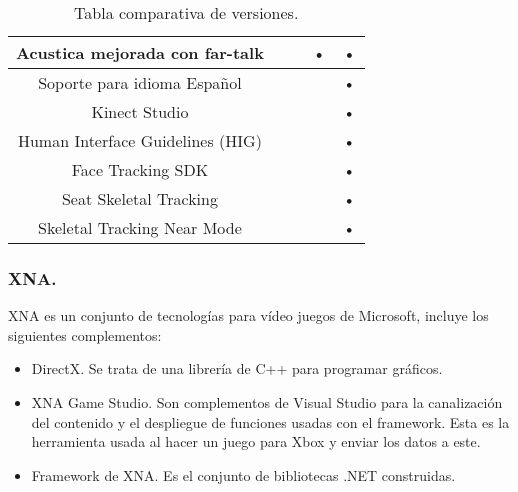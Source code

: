 \documentclass[11pt,a4paper]{article}
\begin{document}
\begin{table}
\begin{tabular}{||c||c||c||c||c||}
\hline Acustica mejorada con far-talk           &        &        & •         & •           \\  
\hline Soporte para idioma Español              &        &        &           & •           \\ 
\hline Kinect Studio                            &        &        &           & •           \\ 
\hline Human Interface Guidelines (HIG)         &        &        &           & •           \\ 
\hline Face Tracking SDK                        &        &        &           & •           \\ 
\hline Seat Skeletal Tracking                   &        &        &           & •           \\ 
\hline Skeletal Tracking Near Mode              &        &        &           & •           \\ 
\hline 
\end{tabular} 
\caption{Tabla comparativa de versiones.}
\end{table}

\subsubsection{XNA.}
XNA es un conjunto de tecnologías para vídeo juegos de Microsoft, incluye los siguientes complementos: 
\begin{itemize}
\item DirectX. Se trata de una librería de C++ para programar gráficos.
\item XNA Game Studio. Son complementos de Visual Studio para la canalización del contenido y el despliegue de funciones usadas con el framework. Esta es la herramienta usada al hacer un juego para Xbox y enviar los datos a este.
\item Framework de XNA. Es el conjunto de bibliotecas .NET construidas.
\end{itemize}
\end{document}
